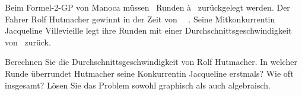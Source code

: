 Beim Formel-2-GP von Manoca müssen \NRO\ Runden à \lRO\ zurückgelegt werden. Der Fahrer Rolf Hutmacher gewinnt in der Zeit von \tHhO\ \tHmO\ \tHsO. Seine Mitkonkurrentin Jacqueline Villevieille legt ihre Runden mit einer Durchschnittsgeschwindigkeit von \vJO\ zurück.

\begin{abcliste}
\abc Berechnen Sie die Durchschnittsgeschwindigkeit von Rolf Hutmacher.
\abc In welcher Runde überrundet Hutmacher seine Konkurrentin Jacqueline erstmals? Wie oft insgesamt? Lösen Sie das Problem sowohl graphisch als auch algebraisch.
\end{abcliste}
